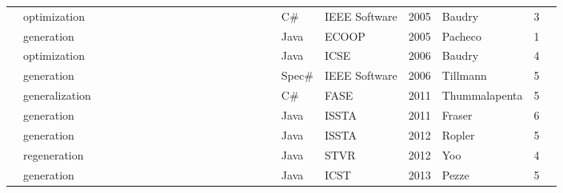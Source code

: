 \begin{table*}
\begin{adjustbox}{max width=\textwidth,center=\textwidth}
\begin{tabular}{llllllllllllllllllllllll}
            \cite{Baudry05d}                                & optimization                      & \X &    &    &    & \X &    &    &    &    &    & \X &    &    &    &    & \X & C\#         & IEEE Software                                            & 2005 & Baudry         & 3 \\
            \cite{Pacheco2005}                              & generation                        & \X &    &    &    &    &    & \X &    &    &    & \X &    &    &    &    &    & Java        & ECOOP                                                    & 2005 & Pacheco        & 1 \\
            \cite{Baudry:2006:ITS:1134285.1134299}          & optimization                      & \X &    &    &    &    &    &    & \X &    &    & \X &    &    &    &    &    & Java        & ICSE                                                     & 2006 & Baudry         & 4 \\
            \cite{tillmann2006unit}                         & generation                        & \X &    &    & \X & \X &    &    &    &    &    & \X &    &    &    & \X &    & Spec\#      & IEEE Software                                            & 2006 & Tillmann       & 5 \\
            \cite{marri2010retrofitting}                    & generalization                    & \X &    &    & \X & \X &    &    &    &    &    & \X &    &    &    & \X &    & C\#         & FASE                                                     & 2011 & Thummalapenta  & 5 \\
            \cite{fraser2011generating}                     & generation                        & \X &    &    &    &    &    & \X &    &    &    & \X & \X &    &    &    &    & Java        & ISSTA                                                    & 2011 & Fraser         & 6 \\
            \cite{robetaler2012isolating}                   & generation                        & \X &    &    &    &    &    &    & \X &    &    & \X &    &    &    &    &    & Java        & ISSTA                                                    & 2012 & Ropler         & 5 \\
            \cite{yoo2012}                                  & regeneration                      & \X &    &    &    & \X &    &    &    &    &    & \X &    &    &    &    & \X & Java        & STVR                                                     & 2012 & Yoo            & 4 \\
            \cite{pezze2013}                                & generation                        & \X &    &    &    &    &    & \X &    &    &    & \X &    &    &    &    &    & Java        & ICST                                                     & 2013 & Pezze          & 5 \\

\end{tabular}
\end{adjustbox}
\end{table*}
